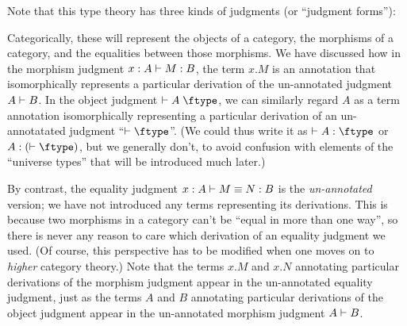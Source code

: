 \begin{rmk}\label{rmk:equality-terms}
  Note that this type theory has three kinds of judgments (or ``judgment forms''):
  Categorically, these will represent the objects of a category, the morphisms of a category, and the equalities between those morphisms.
  We have discussed how in the morphism judgment $x:A\vdash M:B$, the term $x.M$ is an annotation that isomorphically represents a particular derivation of the un-annotated judgment $A\vdash B$.
  In the object judgment $\types A\type$, we can similarly regard $A$ as a term annotation isomorphically representing a particular derivation of an un-annotatated judgment ``$\types\ftype$''.
  (We could thus write it as $\types A:\ftype$ or $A:(\types \ftype)$, but we generally don't, to avoid confusion with elements of the ``universe types'' that will be introduced much later.)

  By contrast, the equality judgment $x:A\vdash M\equiv N:B$ is the \emph{un-annotated} version; we have not introduced any terms representing its derivations.
  This is because two morphisms in a category can't be ``equal in more than one way'', so there is never any reason to care which derivation of an equality judgment we used.
  (Of course, this perspective has to be modified when one moves on to \emph{higher} category theory.)
  Note that the terms $x.M$ and $x.N$ annotating particular derivations of the morphism judgment appear in the un-annotated equality judgment, just as the terms $A$ and $B$ annotating particular derivations of the object judgment appear in the un-annotated morphism judgment $A\vdash B$.
\end{rmk}

